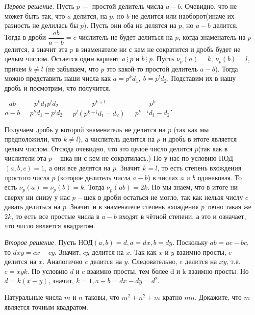 \hspace{3mm}

\textit{Первое решение.}  Пусть $p \ -$ простой делитель числа $ a - b$. Очевидно, что не может быть так, что $a$ делится, на $p$, но $b$ не делится или наоборот(иначе их разность не делилась бы $p$). Пусть они оба не делятся на $p$, но $a-b$ делится. 
Тогда в дроби $\dfrac{ab}{a-b} = c$ числитель не будет делиться на $p$, когда знаменатель на $p$ делится, а значит эта $p$ в знаменателе ни с кем не сократится и дробь будет не целым числом. Остается один вариант $a \ \vdots \ p$ и $b \ \vdots \ p$. Пусть $\nu_p(a) = k$, $\nu_p(b) = l$, причем $k \neq l$ (не забываем, что $p$ это какой-то простой делитель $a-b$). Тогда можно представить наши числа как $a = p^kd_1, \ b = p^ld_2$. Подставим их в нашу дробь и посмотрим, что получится. 

$\dfrac{ab}{a-b} = \dfrac{p^kd_1p^ld_2}{p^kd_1 - p^ld_2} = \dfrac{p^{k+l}}{p^l(p^{k-l}d_1 - d_2)} = \dfrac{p^k}{p^{k-l}d_1 - d_2}$.

Получаем дробь у которой знаменатель не делится на $p$ (так как мы предположили, что $k \neq l$), а числитель делится на $p$ и дробь в итоге является целым числом. Отсюда очевидно, что это целое число делится $p$(так как в числители эта $p-$шка ни с кем не сократилась.) Но у нас по условию НОД$(a, b, c) = 1$, а они все делятся на $p$. Значит $k = l$, то есть степень вхождения простого числа $p$ (которое делитель числа $a-b$) в числах $a$ и $b$ одинаковая. То есть $\nu_p(a) = \nu_p(b) = k$. Тогда $\nu_p(ab) = 2k$. Но мы знаем, что в итоге ни сверху ни снизу у нас $p-$шек в дроби остаться не могло, так как нельзя числу $c$ давать делиться на $p$. Значит и в знаменателе степень вхождения $p$ точно такая же $2k$, то есть все простые числа в $a-b$ входят в чётной степени, а это и означает, что число является квадратом.

\hspace{3mm}

\textit{Второе решение.} Пусть  НОД$(a, b) = d,  a = dx,  b = dy.$  Поскольку  $ab = ac - bc$,  то $dxy = cx - cy.$  Значит, $cy$ делится на $x$. Так как $x$ и $y$ взаимно просты, $c$ делится на $x$. Аналогично $c$ делится на $y$. Следовательно, c делится на $xy$, т.е.  $c = xyk$.  По условию $d$ и $c$ взаимно просты, тем более d и k взаимно просты. Но  $d = k(x - y)$,  значит, $ k = 1, a - b = dx - dy = d^2.$

\hspace{3mm}

 Натуральные числа $m$ и $n$ таковы, что $m^2+n^2+m$ кратно $mn$. Докажите, что $m$ является точным квадратом.

